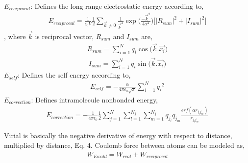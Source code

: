 \documentclass[letterpaper,10pt,english]{sphinxmanual}
\begin{document}
\begin{description}
\sphinxAtStartPar
\(E_{reciprocal}\): Defines the long range electrostatic energy according to,
\begin{equation*}
\begin{split}E_{reciprocal} = \frac{1}{\epsilon_0 V} \frac {1}{2} \sum_{\overrightarrow{k} \ne 0}^{} \frac {1}{\overrightarrow{k}^2}\exp\bigg(\frac {-\overrightarrow{k}^2}{4 \alpha^2}\bigg) \Bigg[ {\Big| R_{sum} \Big|}^2 + {\Big| I_{sum} \Big|}^2 \bigg]\end{split}
\end{equation*}
\sphinxAtStartPar
, where \(\overrightarrow{k}\) is reciprocal vector, \(R_{sum}\) and \(I_{sum}\) are,
\begin{equation*}
\begin{split}R_{sum} = \sum_{i=1}^{N} q_i \cos \big(\overrightarrow{k}.\overrightarrow{x_i}\big)\end{split}
\end{equation*}\begin{equation*}
\begin{split}I_{sum} = \sum_{i=1}^{N} q_i \sin \big(\overrightarrow{k}.\overrightarrow{x_i}\big)\end{split}
\end{equation*}
\sphinxAtStartPar
\(E_{self}\): Defines the self energy according to,
\begin{equation*}
\begin{split}E_{self} = -\frac{\alpha}{4\pi \epsilon_0 \sqrt{\pi}} \sum_{i=1}^{N} {q_i}^2\end{split}
\end{equation*}
\sphinxAtStartPar
\(E_{correction}\): Defines intra\sphinxhyphen{}molecule nonbonded energy,
\begin{equation*}
\begin{split}E_{correction} = -\frac{1}{4\pi \epsilon_0} \frac{1}{2} \sum_{j=1}^{N }\sum_{l =1}^{N_j} \sum_{m = 1}^{N_j} q_{j_l} q_{j_m}  \frac{erf(\alpha r_{j_l j_m})}{r_{j_l j_m}}\end{split}
\end{equation*}
\item[{\sphinxcode{\sphinxupquote{Virial Calculation}}}] \leavevmode
\sphinxAtStartPar
Virial is basically the negative derivative of energy with respect to distance, multiplied by distance, Eq. 4. Coulomb force between atoms can be modeled as,
\begin{equation*}
\begin{split}W_{Ewald} = W_{real} + W_{reciprocal}\end{split}
\end{equation*}

\end{description}
\end{document}
